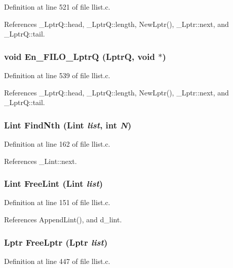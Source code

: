 Definition at line 521 of file llist.c.

References \_\-Lptr\-Q::head, \_\-Lptr\-Q::length, New\-Lptr(), \_\-Lptr::next, and \_\-Lptr\-Q::tail.
\subsubsection{\setlength{\rightskip}{0pt plus 5cm}void En\_\-FILO\_\-Lptr\-Q (\bf{Lptr\-Q}, void $\ast$)}\label{llist_8h_30fc093bae5dee0f41d1254f8a795dc6}




Definition at line 539 of file llist.c.

References \_\-Lptr\-Q::head, \_\-Lptr\-Q::length, New\-Lptr(), \_\-Lptr::next, and \_\-Lptr\-Q::tail.
\subsubsection{\setlength{\rightskip}{0pt plus 5cm}\bf{Lint} Find\-Nth (\bf{Lint} {\em list}, int {\em N})}\label{llist_8h_6e4d57b1412fce1b2b23b76fdc5db19f}




Definition at line 162 of file llist.c.

References \_\-Lint::next.
\subsubsection{\setlength{\rightskip}{0pt plus 5cm}\bf{Lint} Free\-Lint (\bf{Lint} {\em list})}\label{llist_8h_9f36db3dd4aaf36292db4c5f5d89db6f}




Definition at line 151 of file llist.c.

References Append\-Lint(), and d\_\-lint.
\subsubsection{\setlength{\rightskip}{0pt plus 5cm}\bf{Lptr} Free\-Lptr (\bf{Lptr} {\em list})}\label{llist_8h_dfe389f3ed9d48050fbbd5683b647acb}




Definition at line 447 of file llist.c.

